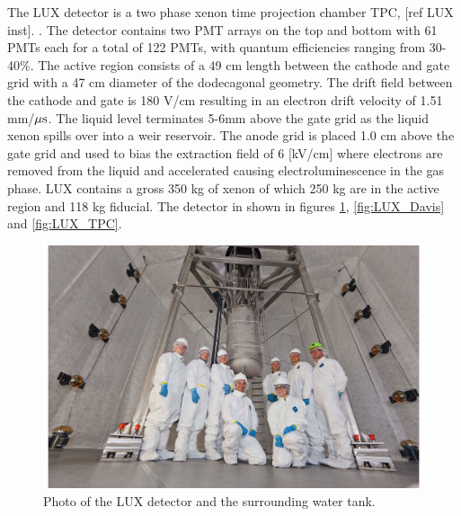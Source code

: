 The LUX detector is a two phase xenon time projection chamber TPC,  [ref LUX inst]. . The detector contains two PMT arrays on the top and bottom with 61 PMTs each for a total of 122 PMTs, with quantum efficiencies ranging from 30-40\%. The active region consists of a 49 cm length between the cathode and gate grid with a 47 cm diameter of the dodecagonal geometry. The drift field between the cathode and gate is 180 V/cm resulting in an electron drift velocity of 1.51 mm/$\rm \mu s$. The liquid level terminates 5-6mm above the gate grid as the liquid xenon spills over into a weir reservoir. The anode grid is placed 1.0 cm above the gate grid and used to bias the extraction field of 6 [kV/cm] where electrons are removed from the liquid and accelerated causing electroluminescence in the gas phase.  LUX contains a gross 350 kg of xenon of which 250 kg are in the active region and 118 kg fiducial.  The detector in shown in figures \ref{fig:LUX_Real}, \ref{fig:LUX_Davis} and \ref{fig:LUX_TPC}.

 \begin{figure}[h!]\centering
\includegraphics[scale=0.5]{Chapter_LUX_Det/LUX_Real.png}
\caption{Photo of the LUX detector and the surrounding water tank.}
\label{fig:LUX_Real}
\end{figure}


